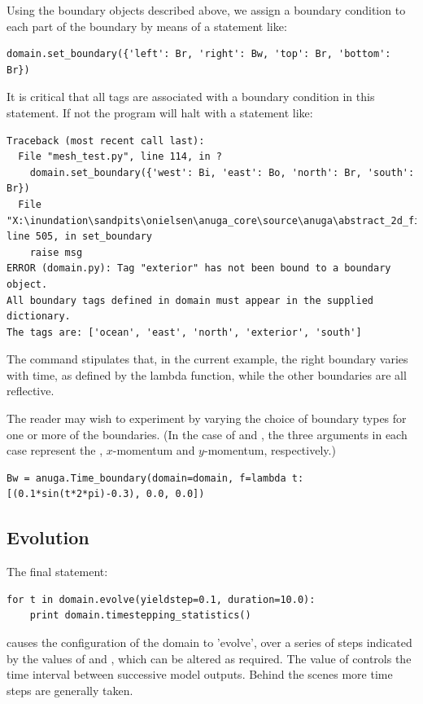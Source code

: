 \documentclass{manual}
\begin{document}
Using the boundary objects described above, we assign a boundary
condition to each part of the boundary by means of a statement like:

\begin{verbatim}
domain.set_boundary({'left': Br, 'right': Bw, 'top': Br, 'bottom': Br})
\end{verbatim}

It is critical that all tags are associated with a boundary condition in this statement.
If not the program will halt with a statement like:

\begin{verbatim}
Traceback (most recent call last):
  File "mesh_test.py", line 114, in ?
    domain.set_boundary({'west': Bi, 'east': Bo, 'north': Br, 'south': Br})
  File "X:\inundation\sandpits\onielsen\anuga_core\source\anuga\abstract_2d_finite_volumes\domain.py", line 505, in set_boundary
    raise msg
ERROR (domain.py): Tag "exterior" has not been bound to a boundary object.
All boundary tags defined in domain must appear in the supplied dictionary.
The tags are: ['ocean', 'east', 'north', 'exterior', 'south']
\end{verbatim}

The command  stipulates that, in the current example, the right
boundary varies with time, as defined by the lambda function, while the other
boundaries are all reflective.

The reader may wish to experiment by varying the choice of boundary
types for one or more of the boundaries. (In the case of 
and , the three arguments in each case represent the
, $x$-momentum and $y$-momentum, respectively.)

\begin{verbatim}
Bw = anuga.Time_boundary(domain=domain, f=lambda t: [(0.1*sin(t*2*pi)-0.3), 0.0, 0.0])
\end{verbatim}

\subsection{Evolution}

The final statement: 

\begin{verbatim}
for t in domain.evolve(yieldstep=0.1, duration=10.0):
    print domain.timestepping_statistics()
\end{verbatim}

causes the configuration of the domain to 'evolve', over a series of
steps indicated by the values of  and
, which can be altered as required.  The value of
 controls the time interval between successive model
outputs.  Behind the scenes more time steps are generally taken.
\end{document}
